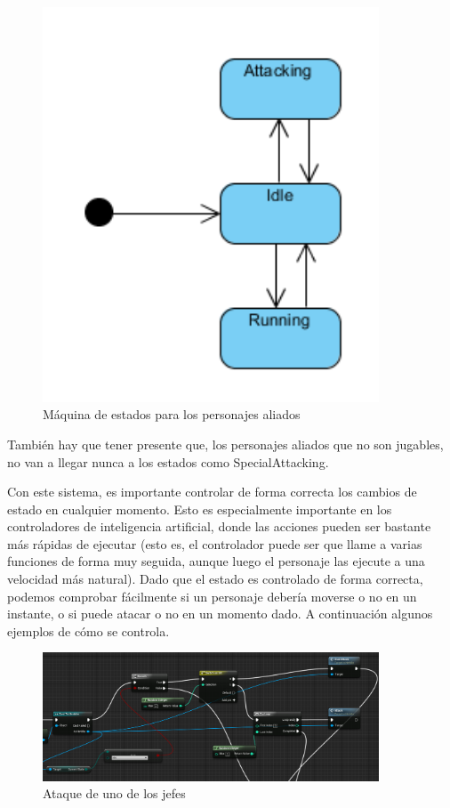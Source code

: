 \begin{figure}[H]
  \centering
  \includegraphics[width=10cm]{./images/SM_Enemy.png}
  \caption{Máquina de estados para los personajes aliados}
  \label{EnemySM}
\end{figure}


También hay que tener presente que, los personajes aliados que no son jugables, no van a llegar nunca a los estados como SpecialAttacking.


Con este sistema, es importante controlar de forma correcta los cambios de estado en cualquier momento. Esto es especialmente importante en los controladores de inteligencia artificial, donde las acciones pueden ser bastante más rápidas de ejecutar (esto es, el controlador puede ser que llame a varias funciones de forma muy seguida, aunque luego el personaje las ejecute a una velocidad más natural). Dado que el estado es controlado de forma correcta, podemos comprobar fácilmente si un personaje debería moverse o no en un instante, o si puede atacar o no en un momento dado. A continuación algunos ejemplos de cómo se controla.


\begin{figure}[H]
  \centering
  \includegraphics[width=10cm]{./images/Henkka_Attack.png}
  \caption{Ataque de uno de los jefes}
  \label{HenkkaAttack}
\end{figure}

